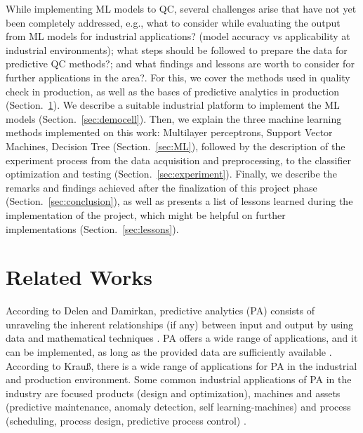 \documentclass[5p,times,procedia]{elsarticle}
\begin{document}
While implementing ML models to QC, several challenges arise that have not yet been completely addressed, e.g., what to consider while evaluating the output from ML models for industrial applications? (model accuracy vs applicability at industrial environments); what steps should be followed to prepare the data for predictive QC methods?; and what findings and lessons are worth to consider for further applications in the area?. 
For this, we cover the methods used in quality check in production, as well as the bases of predictive analytics in production (Section.~\ref{sec:related_works}). 
We describe a suitable industrial platform to implement the ML models (Section.~\ref{sec:democell}).
Then, we explain the three machine learning methods implemented on this work: Multilayer perceptrons, Support Vector Machines, Decision Tree (Section.~\ref{sec:ML}), followed by the description of the experiment process from the data acquisition and preprocessing, to the classifier optimization and testing (Section.~\ref{sec:experiment}).
Finally, we describe the remarks and findings achieved after the finalization of this project phase (Section.~\ref{sec:conclusion}), as well as presents a list of lessons learned during the implementation of the project, which might be helpful on further implementations (Section.~\ref{sec:lessons}).

\section{Related Works} \label{sec:related_works}%

According to Delen and Damirkan, predictive analytics (PA) consists of unraveling the inherent relationships (if any) between input and output by using data and mathematical techniques \cite{delen2013data}.
PA offers a wide range of applications, and it can be implemented, as long as the provided data are sufficiently available \cite{bishop2006pattern}.
According to Krauß, there is a wide range of applications for PA in the industrial and production environment. Some common industrial applications of PA in the industry are focused products (design and optimization), machines and assets (predictive maintenance, anomaly detection, self learning-machines) and process (scheduling, process design, predictive process control) \cite{krauss2019machine}.
\end{document}
